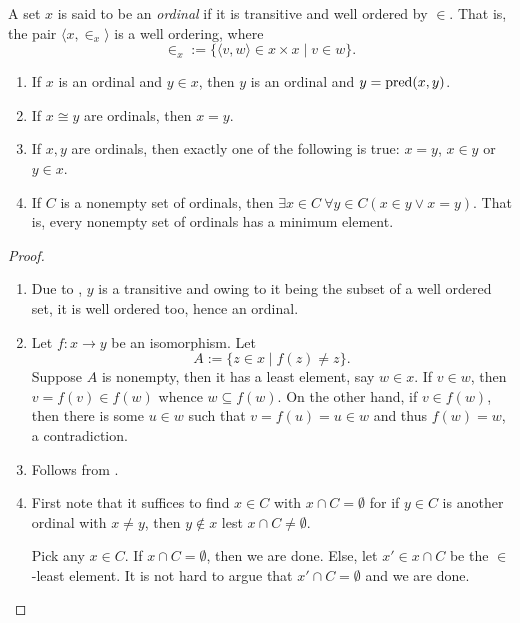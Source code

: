 \begin{definition}[Ordinal]
    A set $x$ is said to be an \emph{ordinal} if it is transitive and well ordered by $\in$. That is, the pair $\langle x,\in_x\rangle$ is a well ordering, where 
    \begin{equation*}
        \in_x := \{\langle v,w\rangle\in x\times x\mid v\in w\}.
    \end{equation*}
\end{definition}

\begin{theorem}\hfill
\begin{enumerate}[label=(\alph*)]
    \item If $x$ is an ordinal and $y\in x$, then $y$ is an ordinal and $y = \operatorname{pred}(x, y)$.
    \item If $x\cong y$ are ordinals, then $x = y$. 
    \item If $x,y$ are ordinals, then exactly one of the following is true: $x = y$, $x\in y$ or $y\in x$. 
    \item If $C$ is a nonempty set of ordinals, then $\exists x\in C~\forall y\in C(x\in y\vee x = y)$. That is, every nonempty set of ordinals has a minimum element.
\end{enumerate}
\end{theorem}
\begin{proof}
\begin{enumerate}[label=(\alph*)]
    \item Due to , $y$ is a transitive and owing to it being the subset of a well ordered set, it is well ordered too, hence an ordinal.

    \item Let $f: x\to y$ be an isomorphism. Let 
    \begin{equation*}
        A := \{z\in x\mid f(z)\ne z\}.
    \end{equation*}
    Suppose $A$ is nonempty, then it has a least element, say $w\in x$. If $v\in w$, then $v = f(v)\in f(w)$ whence $w\subseteq f(w)$. On the other hand, if $v\in f(w)$, then there is some $u\in w$ such that $v = f(u) = u\in w$ and thus $f(w) = w$, a contradiction. 

    \item Follows from .

    \item First note that it suffices to find $x\in C$ with $x\cap C = \emptyset$ for if $y\in C$ is another ordinal with $x\ne y$, then $y\notin x$ lest $x\cap C\ne\emptyset$.

    Pick any $x\in C$. If $x\cap C = \emptyset$, then we are done. Else, let $x'\in x\cap C$ be the $\in$-least element. It is not hard to argue that $x'\cap C = \emptyset$ and we are done.\qedhere
\end{enumerate}
\end{proof}

